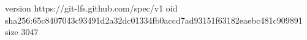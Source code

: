 version https://git-lfs.github.com/spec/v1
oid sha256:65c8407043c93491d2a32dc01334fb0accd7ad93151f63182eaebc481c909891
size 3047
